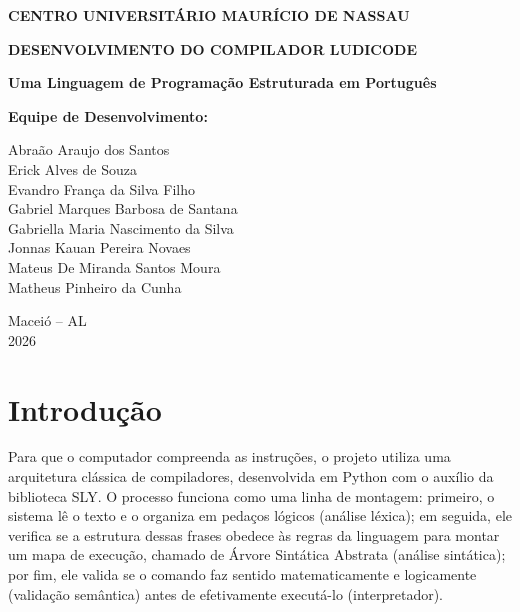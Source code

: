 \documentclass[12pt,a4paper]{article}
\begin{document}
\begin{titlepage}
\begin{center}

\textbf{CENTRO UNIVERSITÁRIO MAURÍCIO DE NASSAU}

\vspace{2.5cm}

\textbf{\Large DESENVOLVIMENTO DO COMPILADOR LUDICODE}

\vspace{0.5cm}
\textbf{\large Uma Linguagem de Programação Estruturada em Português}

\vspace{2cm}

\textbf{Equipe de Desenvolvimento:}

\vspace{0.5cm}

Abraão Araujo dos Santos\\
Erick Alves de Souza\\
Evandro França da Silva Filho\\
Gabriel Marques Barbosa de Santana\\
Gabriella Maria Nascimento da Silva\\
Jonnas Kauan Pereira Novaes\\
Mateus De Miranda Santos Moura\\
Matheus Pinheiro da Cunha\\

\vfill

Maceió -- AL\\
2026

\end{center}
\end{titlepage}

\tableofcontents
\newpage

\section{Introdução}

Para que o computador compreenda as instruções, o projeto utiliza uma arquitetura clássica de compiladores, desenvolvida em Python com o auxílio da biblioteca SLY. O processo funciona como uma linha de montagem: primeiro, o sistema lê o texto e o organiza em pedaços lógicos (análise léxica); em seguida, ele verifica se a estrutura dessas frases obedece às regras da linguagem para montar um mapa de execução, chamado de Árvore Sintática Abstrata (análise sintática); por fim, ele valida se o comando faz sentido matematicamente e logicamente (validação semântica) antes de efetivamente executá-lo (interpretador).
\end{document}
